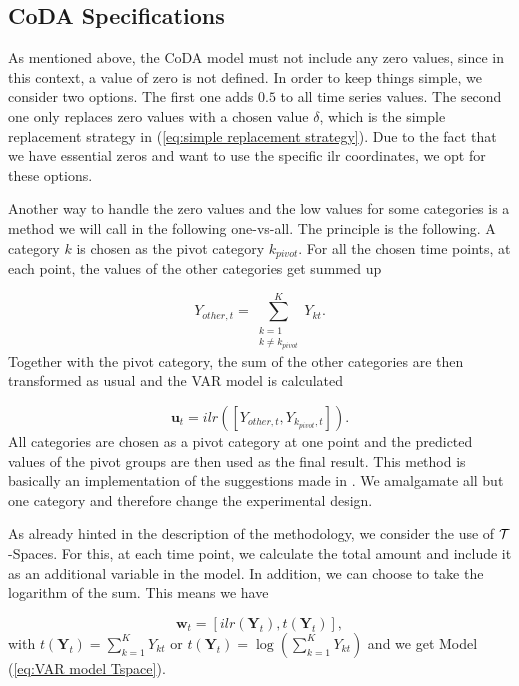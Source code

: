 \subsection{CoDA Specifications}
\label{sec: Coda Specifications}

As mentioned above, the CoDA model must not include any zero values, since in this context, a value of zero is not defined. In order to keep things simple, we consider two options. The first one adds $0.5$ to all time series values. The second one only replaces zero values with a chosen value $\delta$, which is the simple replacement strategy in (\ref{eq:simple replacement strategy}). Due to the fact that we have essential zeros and want to use the specific ilr coordinates, we opt for these options. 

Another way to handle the zero values and the low values for some categories is a method we will call in the following one-vs-all. The principle is the following. A category $k$ is chosen as the pivot category $k_{pivot}$. For all the chosen time points, at each point, the values of the other categories get summed up

\begin{equation}
Y_{other,t} = \sum_{\substack{k=1 \\ k \neq k_{pivot}}}^K Y_{kt}.
\label{eq:one vs all}
\end{equation}
%
Together with the pivot category, the sum of the other categories are then transformed as usual and the VAR model is calculated 

\begin{equation}
\bm{u}_t = ilr([Y_{other,t}, Y_{k_{pivot},t}]).
\label{eq:one vs all ilr}
\end{equation}
%
All categories are chosen as a pivot category at one point and the predicted values of the pivot groups are then used as the final result. This method is basically an implementation of the suggestions made in \textcite{Aitchison:2003}. We amalgamate all but one category and therefore change the experimental design. 

As already hinted in the description of the methodology, we consider the use of $\mathcal{T}$-Spaces. For this, at each time point, we calculate the total amount and include it as an additional variable in the model. In addition, we can choose to take the logarithm of the sum. This means we have 

\begin{equation}
\bm{w}_t = [ilr(\bm{Y}_t),t(\bm{Y}_t)],
\label{eq:Tspace u}
\end{equation}
%
with $t(\bm{Y}_t) = \sum_{k=1}^K Y_{kt}$ or $t(\bm{Y}_t) = \log\left(\sum_{k=1}^K Y_{kt}\right)$ and we get Model (\ref{eq:VAR model Tspace}).

